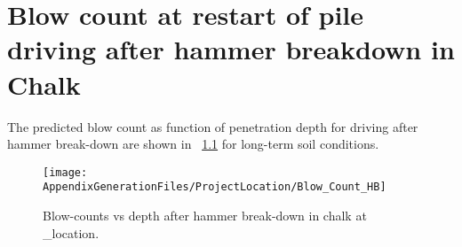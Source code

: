 \chapter{Blow count at restart of pile driving after hammer breakdown in Chalk}\label{sec_1}
The predicted blow count as function of penetration depth for driving after
hammer break-down are shown in ~\ref{blow_count_HBreak} for long-term soil conditions.

\begin{figure}[!htbp]
\texttt{[image: AppendixGenerationFiles/ProjectLocation/Blow\_Count\_HB]}
\caption{Blow-counts vs depth after hammer break-down in chalk at {\ID_location}.}
\label{blow_count_HBreak}\end{figure}

\newpage


